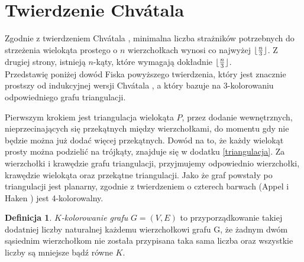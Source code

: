 \documentclass[brudnopis]{xmgr}
\DeclarePairedDelimiter\floor{\lfloor}{\rfloor}
\theoremstyle{definition}
\newtheorem{Definicja}{Definicja}
\begin{document}
\section{Twierdzenie Chv\'atala}
Zgodnie z twierdzeniem Chv\'atala \cite{chvatal} \label{tw chvatala}, minimalna liczba strażników potrzebnych do strzeżenia wielokąta prostego o $n$ wierzchołkach wynosi co najwyżej $\floor{\frac{n}{3}}$.
Z drugiej strony, istnieją $n$-kąty, które wymagają dokładnie $\floor{\frac{n}{3}}$.
\\Przedstawię poniżej dowód Fiska \cite{fisk} powyższego twierdzenia, który jest znacznie prostszy od indukcyjnej wersji Chv\'atala \cite{chvatal}, a który bazuje na $3$-kolorowaniu odpowiedniego grafu triangulacji. 

Pierwszym krokiem jest triangulacja wielokąta $P$, przez dodanie wewnętrznych, nieprzecinających się przekątnych między wierzchołkami, do momentu gdy nie będzie można już dodać więcej przekątnych. 
Dowód na to, że każdy wielokąt prosty można podzielić na trójkąty, znajduje się w dodatku \ref{triangulacja}.
Za wierzchołki i krawędzie grafu triangulacji, przyjmujemy odpowiednio wierzchołki, krawędzie wielokąta oraz przekątne triangulacji. Jako że graf powstały po triangulacji jest planarny, zgodnie z twierdzeniem o czterech barwach (Appel i Haken \cite{appel}) jest 4-kolorowalny.

\begin{Definicja} 
   \emph{$K$-kolorowanie grafu} $G = (V,E)$ to przyporządkowanie takiej dodatniej liczby naturalnej każdemu wierzchołkowi grafu G, że żadnym dwóm sąsiednim wierzchołkom nie została przypisana taka sama liczba oraz wszystkie liczby są mniejsze bądź równe $K$.
\end{Definicja}
\end{document}
